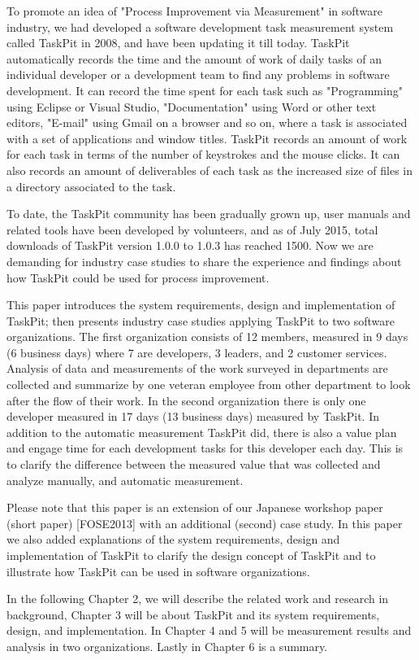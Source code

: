 \documentclass [paper]{ieice}
\begin{document}
	To promote an idea of "Process Improvement via Measurement" in software industry, we had developed a software development task measurement system called TaskPit\cite{taskpit} in 2008, and have been updating it till today. TaskPit automatically records the time and the amount of work of daily tasks of an individual developer or a development team to find any problems in software development. It can record the time spent for each task such as "Programming" using Eclipse or Visual Studio, "Documentation" using Word or other text editors, "E-mail" using Gmail on a browser and so on, where a task is associated with a set of applications and window titles. TaskPit records an amount of work for each task in terms of the number of keystrokes and the mouse clicks. It can also records an amount of deliverables of each task as the increased size of files in a directory associated to the task. \par
	To date, the TaskPit community has been gradually grown up, user manuals and related tools have been developed by volunteers, and as of July 2015, total downloads of TaskPit version 1.0.0 to 1.0.3 has reached 1500\cite{taskpit}. Now we are demanding for industry case studies to share the experience and findings about how TaskPit could be used for process improvement. \par
	This paper introduces the system requirements, design and implementation of TaskPit; then presents industry case studies applying TaskPit to two software organizations. The first organization consists of 12 members, measured in 9 days (6 business days) where 7 are developers, 3 leaders, and 2 customer services. Analysis of data and measurements of the work surveyed in departments are collected and summarize by one veteran employee from other department to look after the flow of their work. In the second organization there is only one developer measured in 17 days (13 business days) measured by TaskPit. In addition to the automatic measurement TaskPit did, there is also a value plan and engage time for each development tasks for this developer each day. This is to clarify the difference between the measured value that was collected and analyze manually, and automatic measurement. \par
	Please note that this paper is an extension of our Japanese workshop paper (short paper) [FOSE2013] with an additional (second) case study. In this paper we also added explanations of the system requirements, design and implementation of TaskPit to clarify the design concept of TaskPit and to illustrate how TaskPit can be used in software organizations. \par
	In the following Chapter 2, we will describe the related work and research in background, Chapter 3 will be about TaskPit and its system requirements, design, and implementation. In Chapter 4 and 5 will be measurement results and analysis in two organizations. Lastly in Chapter 6 is a summary.
	
\end{document}
